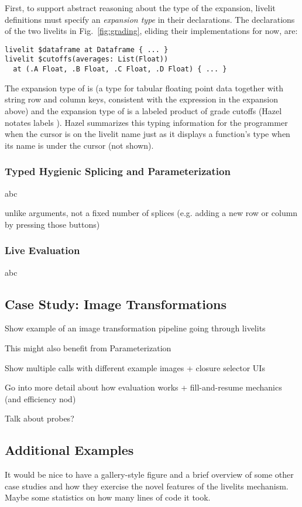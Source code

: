 First, to support abstract reasoning about the type of the expansion, 
livelit definitions must specify an \emph{expansion type} in their declarations.
The declarations of the two livelits in Fig.~\ref{fig:grading}, 
eliding their implementations for now, are:
\begin{lstlisting}[numbers=none]
livelit $dataframe at Dataframe { ... }
livelit $cutoffs(averages: List(Float)) 
  at (.A Float, .B Float, .C Float, .D Float) { ... }
\end{lstlisting}
The expansion type of  is  
(a type for tabular floating point data together with string row and column keys, consistent with the expression in the expansion above)
and the expansion type of  is a labeled product of grade cutoffs (Hazel notates labels ).
Hazel summarizes this typing information for the programmer when the cursor is on the livelit name 
just as it displays a function's type when its name is under the cursor (not shown).

\subsubsection{Typed Hygienic Splicing and Parameterization} abc

unlike arguments, not a fixed number of splices (e.g. adding a new row or column by pressing those buttons)

\subsubsection{Live Evaluation} abc

\subsection{Case Study: Image Transformations}\label{sec:image-transformation}
Show example of an image transformation pipeline going through livelits

This might also benefit from Parameterization

Show multiple calls with different example images + closure selector UIs

Go into more detail about how evaluation works + fill-and-resume mechanics (and efficiency nod)

Talk about probes?

\subsection{Additional Examples}\label{sec:additional-examples}
It would be nice to have a gallery-style figure and a brief overview of some other case studies
and how they exercise the novel features of the livelits mechanism. Maybe some statistics on how
many lines of code it took.
